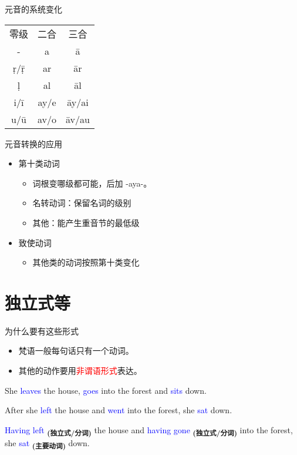 \documentclass[17pt]{beamer}
\newcommand{\fullpada}[1]{\textcolor{OliveGreen}{#1}}
\newcommand{\veryimportant}[1]{\textcolor{red}{#1}}
\newcommand{\important}[1]{\textcolor{blue}{#1}}
\begin{document}
\begin{frame}{元音的系统变化}
  \centering
    \begin{tabular}{@{}ccc@{}} %
      零级 & 二合 & 三合  \\
      \fullpada{-} & \fullpada{a} & \fullpada{ā} \\
      \hline
      \fullpada{ṛ/ṝ}  & \fullpada{ar} & \fullpada{ār}   \\
      \fullpada{ḷ}  & \fullpada{al} & \fullpada{āl}   \\
      \hline
      \fullpada{i/ī} & \fullpada{ay/e} & \fullpada{āy/ai} \\
      \fullpada{u/ū} & \fullpada{av/o} & \fullpada{āv/au} \\
    \end{tabular}
\end{frame}

\begin{frame}{元音转换的应用}
  \begin{itemize}
    \item 第十类动词
    \begin{itemize}
      \item
        词根变哪级都可能，后加 \nobreakdash-aya\nobreakdash-。
      \item 名转动词：保留名词的级别
      \item 其他：能产生重音节的最低级
    \end{itemize}
    \item 致使动词
    \begin{itemize}
      \item
        其他类的动词按照第十类变化
    \end{itemize}
  \end{itemize}
\end{frame}

\section{独立式等}
\begin{frame}{\insertsection }
  \small
  \tableofcontents[currentsection]
\end{frame}

\begin{frame}{为什么要有这些形式}
  \begin{itemize}
    \item 梵语一般每句话只有一个动词。
    \item 其他的动作要用\veryimportant{非谓语形式}表达。
  \end{itemize}
  \bigskip
    {\footnotesize
    She \important{leaves} the house, \important{goes} into the forest and \important{sits} down.

    After she \important{left} the house and \important{went} into the forest, she \important{sat} down.

    \important{Having left} \textsubscript{\textbf{(独立式/分词)}}  the house and \important{having gone} \textsubscript{\textbf{(独立式/分词)}}  into the forest, 
she \important{sat} \textsubscript{\textbf{(主要动词)}} down.
    }
\end{frame}
\end{document}
